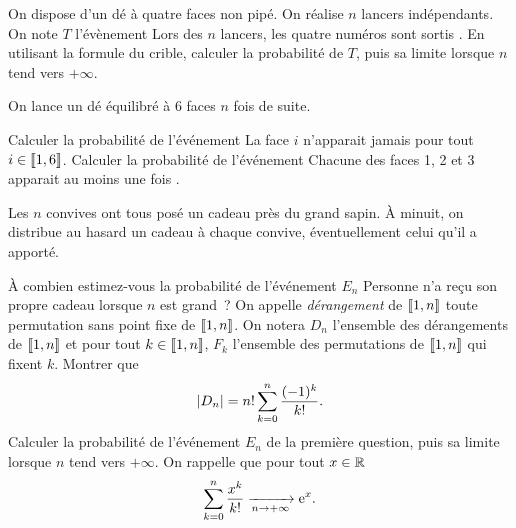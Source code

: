 \documentclass{magnolia}
\begin{document}
On dispose d'un dé à quatre faces non pipé. On réalise $n$ lancers indépendants.
On note $T$ l'évènement  \og Lors des $n$ lancers, les quatre numéros sont sortis \fg.
En utilisant la formule du crible, calculer la probabilité de $T$, puis sa limite lorsque $n$
tend vers $+\infty$.

On lance un dé équilibré à 6 faces $n$ fois de suite.
\begin{questions}
\question Calculer la probabilité de l'événement \og La face $i$ n'apparait jamais \fg
  pour tout $i\in\left\llbracket 1,6\right\rrbracket$.
\question Calculer la probabilité de l'événement \og Chacune des faces 1, 2 et 3 apparait au moins une fois \fg.
\end{questions}

Les $n$ convives ont tous posé un cadeau près du grand sapin. À minuit, on distribue au
hasard un cadeau à chaque convive, éventuellement celui qu'il a apporté.
\begin{questions}
\question À combien estimez-vous la probabilité de l'événement $E_n$ \og Personne n'a
reçu son propre cadeau \fg lorsque $n$ est grand~?
\enonce On appelle \emph{dérangement} de $\left\llbracket 1,n\right\rrbracket$ toute permutation sans
point fixe de $\left\llbracket 1,n\right\rrbracket$. On notera $D_n$ l'ensemble des dérangements de
$\left\llbracket 1,n\right\rrbracket$ et pour tout $k\in\left\llbracket 1,n\right\rrbracket$, $F_k$ l'ensemble des permutations de
$\left\llbracket 1,n\right\rrbracket$ qui fixent $k$.
\question Montrer que
\[\left|D_n\right|=n! \sum_{k=0}^n \frac{(-1)^k}{k!}.\]
\question Calculer la probabilité de l'événement $E_n$ de la première question, puis sa
limite lorsque $n$ tend vers $+\infty$. On rappelle que pour tout $x\in\mathbb{R}$
\[\sum_{k=0}^n \frac{x^k}{k!}\xrightarrow[n\rightarrow +\infty]{}{\rm e}^x.\]
\end{questions}

\end{document}
